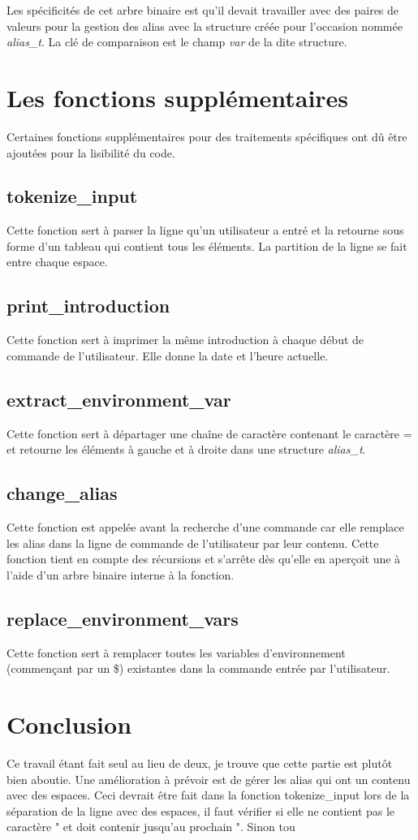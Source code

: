 \documentclass[a4paper,10pt]{article}
\begin{document}
Les spécificités de cet arbre binaire est qu'il devait travailler avec des paires de valeurs pour la gestion des alias avec la structure créée pour l'occasion nommée \emph{alias\_t}. La clé de comparaison est le champ \emph{var} de la dite structure.
\section{Les fonctions supplémentaires}
Certaines fonctions supplémentaires pour des traitements spécifiques ont dû être ajoutées pour la lisibilité du code.
\subsection{tokenize\_input}
Cette fonction sert à parser la ligne qu'un utilisateur a entré et la retourne sous forme d'un tableau qui contient tous les éléments. La partition de la ligne se fait entre chaque espace.
\subsection{print\_introduction}
Cette fonction sert à imprimer la même introduction à chaque début de commande de l'utilisateur. Elle donne la date et l'heure actuelle.
\subsection{extract\_environment\_var}
Cette fonction sert à départager une chaîne de caractère contenant le caractère = et retourne les éléments à gauche et à droite dans une structure \emph{alias\_t}.
\subsection{change\_alias}
Cette fonction est appelée avant la recherche d'une commande car elle remplace les alias dans la ligne de commande de l'utilisateur par leur contenu. Cette fonction tient en compte des récursions et s'arrête dès qu'elle en aperçoit une à l'aide d'un arbre binaire interne à la fonction.
\subsection{replace\_environment\_vars}
Cette fonction sert à remplacer toutes les variables d'environnement (commençant par un \$) existantes dans la commande entrée par l'utilisateur.
\section{Conclusion}
Ce travail étant fait seul au lieu de deux, je trouve que cette partie est plutôt bien aboutie.
Une amélioration à prévoir est de gérer les alias qui ont un contenu avec des espaces. Ceci devrait être fait dans la fonction tokenize\_input lors de la séparation de la ligne avec des espaces, il faut vérifier si elle ne contient pas le caractère " et doit contenir jusqu'au prochain ".
Sinon tou 


\end{document}
